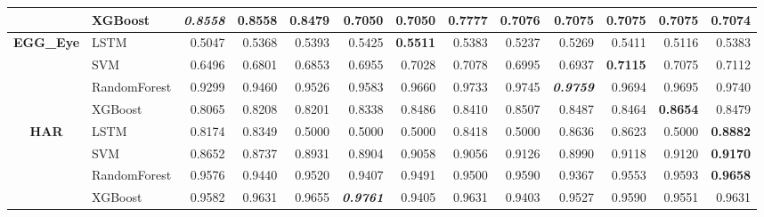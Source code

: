 \begin{table}[H]
\begin{adjustbox}{max width=12cm}
\begin{tabular}{|c|l|r|r|r|r|r|r|r|r|r|r|r|}
			                      & XGBoost      & \textit{\textbf{0.8558}} & 0.8558                   & 0.8479          & 0.7050                   & 0.7050          & 0.7777 & 0.7076          & 0.7075                   & 0.7075                   & 0.7075          & 0.7074          \\
			\hline
			\textbf{EGG\_Eye}     & LSTM         & 0.5047                   & 0.5368                   & 0.5393          & 0.5425                   & \textbf{0.5511} & 0.5383 & 0.5237          & 0.5269                   & 0.5411                   & 0.5116          & 0.5383          \\
			                      & SVM          & 0.6496                   & 0.6801                   & 0.6853          & 0.6955                   & 0.7028          & 0.7078 & 0.6995          & 0.6937                   & \textbf{0.7115}          & 0.7075          & 0.7112          \\
			                      & RandomForest & 0.9299                   & 0.9460                   & 0.9526          & 0.9583                   & 0.9660          & 0.9733 & 0.9745          & \textit{\textbf{0.9759}} & 0.9694                   & 0.9695          & 0.9740          \\
			                      & XGBoost      & 0.8065                   & 0.8208                   & 0.8201          & 0.8338                   & 0.8486          & 0.8410 & 0.8507          & 0.8487                   & 0.8464                   & \textbf{0.8654} & 0.8479          \\
			\hline
			\textbf{HAR}          & LSTM         & 0.8174                   & 0.8349                   & 0.5000          & 0.5000                   & 0.5000          & 0.8418 & 0.5000          & 0.8636                   & 0.8623                   & 0.5000          & \textbf{0.8882} \\
			                      & SVM          & 0.8652                   & 0.8737                   & 0.8931          & 0.8904                   & 0.9058          & 0.9056 & 0.9126          & 0.8990                   & 0.9118                   & 0.9120          & \textbf{0.9170} \\
			                      & RandomForest & 0.9576                   & 0.9440                   & 0.9520          & 0.9407                   & 0.9491          & 0.9500 & 0.9590          & 0.9367                   & 0.9553                   & 0.9593          & \textbf{0.9658} \\
			                      & XGBoost      & 0.9582                   & 0.9631                   & 0.9655          & \textit{\textbf{0.9761}} & 0.9405          & 0.9631 & 0.9403          & 0.9527                   & 0.9590                   & 0.9551          & 0.9631          \\

\end{tabular}
\end{adjustbox}
\end{table}
